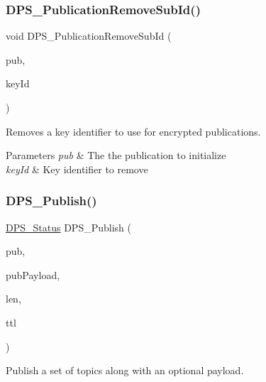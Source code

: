 \subsubsection{\texorpdfstring{D\+P\+S\+\_\+\+Publication\+Remove\+Sub\+Id()}{DPS\_PublicationRemoveSubId()}}
{\footnotesize\ttfamily void D\+P\+S\+\_\+\+Publication\+Remove\+Sub\+Id (\begin{DoxyParamCaption}\item[{\hyperlink{group__publication_ga0d439693474aa54e27f3d45a054696ac}{D\+P\+S\+\_\+\+Publication} $\ast$}]{pub,  }\item[{const \hyperlink{group__keystore_ga4345e29dd2ad5d7fd88a1e988787bd72}{D\+P\+S\+\_\+\+Key\+Id} $\ast$}]{key\+Id }\end{DoxyParamCaption})}



Removes a key identifier to use for encrypted publications. 


\begin{DoxyParams}{Parameters}
{\em pub} & The the publication to initialize \\
\hline
{\em key\+Id} & Key identifier to remove \\
\hline
\end{DoxyParams}
\mbox{\label{group__publication_ga828a4efc5c235c48a81f6460cc3fe416}} 
\subsubsection{\texorpdfstring{D\+P\+S\+\_\+\+Publish()}{DPS\_Publish()}}
{\footnotesize\ttfamily \hyperlink{group__status_ga30395a84d3cad9d4ec29848106415038}{D\+P\+S\+\_\+\+Status} D\+P\+S\+\_\+\+Publish (\begin{DoxyParamCaption}\item[{\hyperlink{group__publication_ga0d439693474aa54e27f3d45a054696ac}{D\+P\+S\+\_\+\+Publication} $\ast$}]{pub,  }\item[{const uint8\+\_\+t $\ast$}]{pub\+Payload,  }\item[{size\+\_\+t}]{len,  }\item[{int16\+\_\+t}]{ttl }\end{DoxyParamCaption})}



Publish a set of topics along with an optional payload. 


